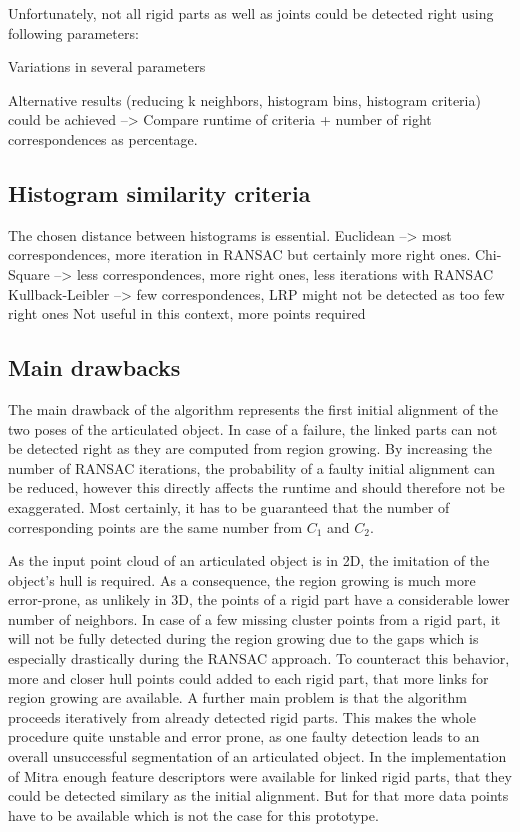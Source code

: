 Unfortunately, not all rigid parts as well as joints could be detected right using following parameters: 








Variations in several parameters


Alternative results (reducing k neighbors, histogram bins, histogram criteria) could be achieved --> Compare runtime of criteria + number of right correspondences as percentage.


\subsection{Histogram similarity criteria}
The chosen distance between histograms is essential. Euclidean --> most correspondences, more iteration in RANSAC but certainly more right ones.
Chi-Square --> less correspondences, more right ones, less iterations with RANSAC
Kullback-Leibler --> few correspondences, LRP might not be detected as too few right ones
Not useful in this context, more points required




\subsection{Main drawbacks}
The main drawback of the algorithm represents the first initial alignment of the two poses of the articulated object. In case of a failure, the linked parts can not be detected right as they are computed from region growing. By increasing the number of RANSAC iterations, the probability of a faulty initial alignment can be reduced, however this directly affects the runtime and should therefore not be exaggerated. Most certainly, it has to be guaranteed that the number of corresponding points are the same number from $C_1$ and $C_2$.


As the input point cloud of an articulated object is in 2D, the imitation of the object's hull is required. As a consequence, the region growing is much more error-prone, as unlikely in 3D, the points of a rigid part have a considerable lower number of neighbors. In case of a few missing cluster points from a rigid part, it will not be fully detected during the region growing due to the gaps which is especially drastically during the RANSAC approach. To counteract this behavior, more and closer hull points could added to each rigid part, that more links for region growing are available. A further main problem is that the algorithm proceeds iteratively from already detected rigid parts. This makes the whole procedure quite unstable and error prone, as one faulty detection leads to an overall unsuccessful segmentation of an articulated object. In the implementation of Mitra enough feature descriptors were available for linked rigid parts, that they could be detected similary as the initial alignment. But for that more data points have to be available which is not the case for this prototype.

